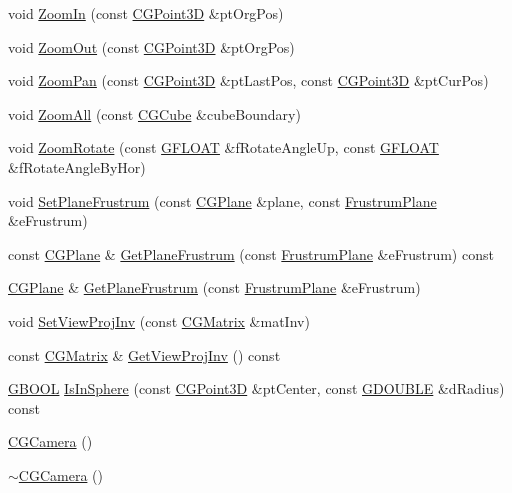 \begin{DoxyCompactItemize}
\item 
void \hyperlink{class_c_g_camera_a19295431de67f03c3208740307225c9a}{Zoom\+In} (const \hyperlink{class_c_g_point3_d}{C\+G\+Point3\+D} \&pt\+Org\+Pos)
\item 
void \hyperlink{class_c_g_camera_ab73063011d972f6d6d7d2969f819b50d}{Zoom\+Out} (const \hyperlink{class_c_g_point3_d}{C\+G\+Point3\+D} \&pt\+Org\+Pos)
\item 
void \hyperlink{class_c_g_camera_a96c4bfe03528e6287d867a954f2e0d9f}{Zoom\+Pan} (const \hyperlink{class_c_g_point3_d}{C\+G\+Point3\+D} \&pt\+Last\+Pos, const \hyperlink{class_c_g_point3_d}{C\+G\+Point3\+D} \&pt\+Cur\+Pos)
\item 
void \hyperlink{class_c_g_camera_a84b7228a3b51e6380f14dec44614f70b}{Zoom\+All} (const \hyperlink{class_c_g_cube}{C\+G\+Cube} \&cube\+Boundary)
\item 
void \hyperlink{class_c_g_camera_a9e31ef05d433303052f16f15933dd28c}{Zoom\+Rotate} (const \hyperlink{_g_types_8h_abf6eba8223df62f199b811a6c52ff2ef}{G\+F\+L\+O\+A\+T} \&f\+Rotate\+Angle\+Up, const \hyperlink{_g_types_8h_abf6eba8223df62f199b811a6c52ff2ef}{G\+F\+L\+O\+A\+T} \&f\+Rotate\+Angle\+By\+Hor)
\item 
void \hyperlink{class_c_g_camera_a606681108b77febee786290a1c264fe4}{Set\+Plane\+Frustrum} (const \hyperlink{class_c_g_plane}{C\+G\+Plane} \&plane, const \hyperlink{_g_math_8h_ad69d320b6ff140b383ec268a4e9482f2}{Frustrum\+Plane} \&e\+Frustrum)
\item 
const \hyperlink{class_c_g_plane}{C\+G\+Plane} \& \hyperlink{class_c_g_camera_adeac62b178ed27f5afc845bc17829398}{Get\+Plane\+Frustrum} (const \hyperlink{_g_math_8h_ad69d320b6ff140b383ec268a4e9482f2}{Frustrum\+Plane} \&e\+Frustrum) const 
\item 
\hyperlink{class_c_g_plane}{C\+G\+Plane} \& \hyperlink{class_c_g_camera_ac0ce44c308c0909c5d88a823c1a8b571}{Get\+Plane\+Frustrum} (const \hyperlink{_g_math_8h_ad69d320b6ff140b383ec268a4e9482f2}{Frustrum\+Plane} \&e\+Frustrum)
\item 
void \hyperlink{class_c_g_camera_a2bc0a34b92db432b5eba111019838935}{Set\+View\+Proj\+Inv} (const \hyperlink{class_c_g_matrix}{C\+G\+Matrix} \&mat\+Inv)
\item 
const \hyperlink{class_c_g_matrix}{C\+G\+Matrix} \& \hyperlink{class_c_g_camera_aefd93b86fd8a37b6be6ec9990a1e5e6b}{Get\+View\+Proj\+Inv} () const 
\item 
\hyperlink{_g_types_8h_a2901915743626352a6820c5405f556dc}{G\+B\+O\+O\+L} \hyperlink{class_c_g_camera_acb0bf0c53233a9f27ce7682160e7230d}{Is\+In\+Sphere} (const \hyperlink{class_c_g_point3_d}{C\+G\+Point3\+D} \&pt\+Center, const \hyperlink{_g_types_8h_afd05ac85f90ee8e2a733928545462cd4}{G\+D\+O\+U\+B\+L\+E} \&d\+Radius) const 
\item 
\hyperlink{class_c_g_camera_abb6d2b67420410308679c1a6bc22e8ee}{C\+G\+Camera} ()
\item 
\hyperlink{class_c_g_camera_a9fcce03c2ef4f6eb3a001a21b9fec01e}{$\sim$\+C\+G\+Camera} ()
\end{DoxyCompactItemize}


